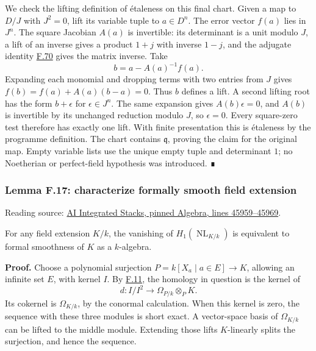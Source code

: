 \documentclass[11pt,a4paper,openany]{report}
\begin{document}
We check the lifting definition of étaleness on this final chart. Given a map to \(D/J\) with \(J^2=0\), lift its variable tuple to \(a\in D^n\). The error vector \(f(a)\) lies in \(J^n\). The square Jacobian \(A(a)\) is invertible: its determinant is a unit modulo \(J\), a lift of an inverse gives a product \(1+j\) with inverse \(1-j\), and the adjugate identity \hyperref[AG-RG-S05-algebra-lemma-matrix-left-inverse]{F.70} gives the matrix inverse. Take \[b=a-A(a)^{-1}f(a).\] Expanding each monomial and dropping terms with two entries from \(J\) gives \(f(b)=f(a)+A(a)(b-a)=0\). Thus \(b\) defines a lift. A second lifting root has the form \(b+\epsilon\) for \(\epsilon\in J^n\). The same expansion gives \(A(b)\epsilon=0\), and \(A(b)\) is invertible by its unchanged reduction modulo \(J\), so \(\epsilon=0\). Every square-zero test therefore has exactly one lift. With finite presentation this is étaleness by the programme definition. The chart contains \(\mathfrak q\), proving the claim for the original map. Empty variable lists use the unique empty tuple and determinant \(1\); no Noetherian or perfect-field hypothesis was introduced. ∎

\label{AG-RG-S05-algebra-lemma-characterize-formally-smooth-field-extension}

\subsubsection{Lemma F.17: characterize formally smooth field extension}\label{AG-RG-S05-lemma-f.17-characterize-formally-smooth-field-extension}

Reading source: \href{https://github.com/KokunoYumeto/unofficial-stacks-project-ai-drafts/blob/565b10e987aba5969b21145a0833f42d69f96790/algebra.tex\#L45959-L45969}{AI Integrated Stacks, pinned Algebra, lines 45959--45969}.

For any field extension \(K/k\), the vanishing of \(H_1(\operatorname{NL}_{K/k})\) is equivalent to formal smoothness of \(K\) as a \(k\)-algebra.

\textbf{Proof.} Choose a polynomial surjection \(P=k[X_a\mid a\in E]\to K\), allowing an infinite set \(E\), with kernel \(I\). By \hyperref[AG-RG-S05-algebra-lemma-NL-homotopy]{F.11}, the homology in question is the kernel of \[d:I/I^2\longrightarrow\Omega_{P/k}\otimes_PK.\] Its cokernel is \(\Omega_{K/k}\), by the conormal calculation. When this kernel is zero, the sequence with these three modules is short exact. A vector-space basis of \(\Omega_{K/k}\) can be lifted to the middle module. Extending those lifts \(K\)-linearly splits the surjection, and hence the sequence.
\end{document}
